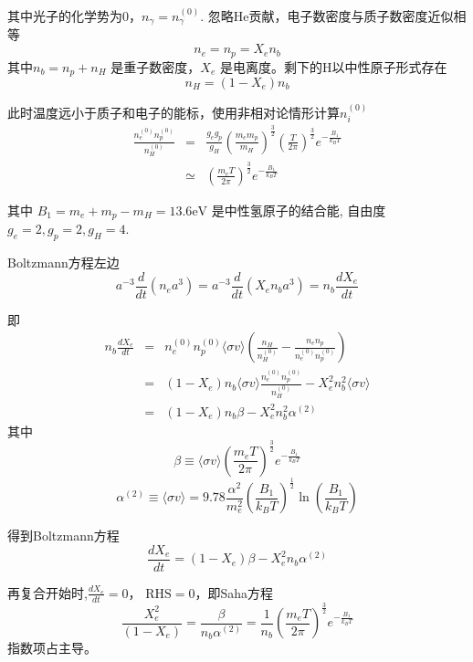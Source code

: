 \documentclass[12pt]{ctexart}
\begin{document}
其中光子的化学势为0，$n_\gamma = n_{\gamma}^{(0)}$.
忽略He贡献，电子数密度与质子数密度近似相等
$$n_{e}=n_{p}=X_{e} n_{b}$$
其中$n_{b}=n_{p}+n_{H}$ 是重子数密度，$X_e$ 是电离度。剩下的H以中性原子形式存在
$$n_{H}=\left(1 - X_{e}\right) n_{b}$$

此时温度远小于质子和电子的能标，使用非相对论情形计算$n_i^{(0)}$
\begin{eqnarray}
      \frac{n_{e}^{(0)} n_{p}^{(0)}}{n_{H}^{(0)}} &=& \frac{g_e g_p}{g_H} \left(\frac{m_e m_p}{m_H}\right)^\frac{3}{2} \left(\frac{T}{2\pi }\right)^\frac{3 }{2} e^{-\frac{B_1}{k_B T}} \\ 
      &\simeq&\left(\frac{m_e T}{2\pi }\right)^\frac{3 }{2} e^{-\frac{B_1}{k_B T}}
\end{eqnarray}

  
其中 $B_1=m_e+m_p - m_H=13.6\mathrm{eV}$ 是中性氢原子的结合能, 自由度 $g_e=2,g_p=2,g_H=4$.

Boltzmann方程左边
\begin{equation}
    a^{-3} \frac{d}{d t}\left(n_{e} a^{3}\right)= a^{-3} \frac{d}{d t}\left(X_{e} n_{b} a^{3}\right) = n_b \frac{d X_e}{dt}
\end{equation}

即
\begin{eqnarray}
    n_b \frac{d X_e}{dt} &=& n_{e}^{(0)} n_{p}^{(0)}\langle\sigma v\rangle\left(\frac{n_H}{n_{H}^{(0)}}-\frac{n_{e} n_{p}}{n_{e}^{(0)} n_{p}^{(0)}}\right)   \\ 
    &=& (1-X_e) n_b \langle\sigma v\rangle \frac{n_{e}^{(0)} n_{p}^{(0)}}{n_H^{(0)}} - X_e^2 n_b^2 \langle\sigma v\rangle \\
    &=& (1-X_e) n_b \beta  - X_e^2 n_b^2 \alpha^{(2)}
\end{eqnarray}
其中
\begin{equation}
    \beta \equiv \langle\sigma v\rangle\left(\frac{m_{e} T}{2 \pi}\right)^\frac{3 }{2} e^{-\frac{B_1}{k_B T}}
\end{equation}
\begin{equation}
    \alpha^{(2)} \equiv \langle\sigma v\rangle=9.78 \frac{\alpha^{2}}{m_{e}^{2}}\left(\frac{B_{1}}{k_{B} T}\right)^\frac{1 }{2} \ln \left(\frac{B_{1}}{k_{B} T}\right)
\end{equation}

得到Boltzmann方程
\begin{equation}
    \frac{d X_{e}}{d t}=\left(1-X_{e}\right) \beta-X_{e}^{2} n_{b} \alpha^{(2)}
\end{equation}

再复合开始时,$\frac{d X_{e}}{d t}=0$， $\text{RHS}=0$，即Saha方程
\begin{equation}
    \frac{X_{e}^{2}}{\left(1-X_{e}\right)} = \frac{\beta}{n_{b} \alpha^{(2)}} = \frac{1 }{n_b} \left(\frac{m_{e} T}{2 \pi}\right)^\frac{3 }{2} e^{-\frac{B_1}{k_B T}}
\end{equation}
指数项占主导。
\end{document}
